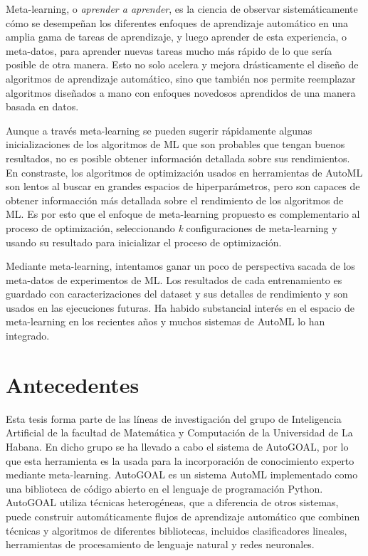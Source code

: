Meta-learning, o \textit{aprender a aprender}, es la ciencia de observar sistemáticamente cómo se desempeñan los diferentes enfoques de aprendizaje automático en una amplia gama de tareas de aprendizaje, y luego aprender de esta experiencia, o meta-datos, para aprender nuevas tareas mucho más rápido de lo que sería posible de otra manera. Esto no solo acelera y mejora drásticamente el diseño de algoritmos de aprendizaje automático, sino que también nos permite reemplazar algoritmos diseñados a mano con enfoques novedosos aprendidos de una manera basada en datos.

Aunque a través meta-learning se pueden sugerir rápidamente algunas inicializaciones de los algoritmos de ML que son probables que tengan buenos resultados, no es posible obtener información detallada sobre sus rendimientos. En constraste, los algoritmos de optimización usados en herramientas de AutoML son lentos al buscar en grandes espacios de hiperparámetros, pero son capaces de obtener informacción más detallada sobre el rendimiento de los algoritmos de ML. Es por esto que el enfoque de meta-learning propuesto es complementario al proceso de optimización, seleccionando \textit{k} configuraciones de meta-learning y usando su resultado para inicializar el proceso de optimización.

Mediante meta-learning, intentamos ganar un poco de perspectiva sacada de los meta-datos de experimentos de ML. Los resultados de cada entrenamiento es guardado con caracterizaciones del dataset y sus detalles de rendimiento y son usados en las ejecuciones futuras. Ha habido substancial interés en el espacio de meta-learning en los recientes años y muchos sistemas de AutoML lo han integrado.

\section*{Antecedentes}

Esta tesis forma parte de las líneas de investigación del grupo de Inteligencia Artificial de la facultad de Matemática y Computación de la Universidad de La Habana. En dicho grupo se ha llevado a cabo el sistema de AutoGOAL,  por lo que esta herramienta es la usada para la incorporación de conocimiento experto mediante meta-learning. AutoGOAL es un sistema AutoML implementado como una biblioteca de código abierto en el lenguaje de programación Python. AutoGOAL utiliza técnicas heterogéneas, que a diferencia de otros sistemas, puede construir automáticamente flujos de aprendizaje automático que combinen técnicas y algoritmos de diferentes bibliotecas, incluidos clasificadores lineales, herramientas de procesamiento de lenguaje natural y redes neuronales.


